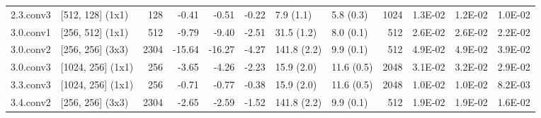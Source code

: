 \begin{table}
\begin{tabular}{llrrrrllrrrr}
2.3.conv3 & [512, 128] (1x1) & 128 & {\cellcolor[HTML]{ECF7A6}} \color[HTML]{000000} -0.41 & {\cellcolor[HTML]{EEF8A8}} \color[HTML]{000000} -0.51 & {\cellcolor[HTML]{EBF7A3}} \color[HTML]{000000} -0.22 & 7.9 (1.1) & 5.8 (0.3) & 1024 & {\cellcolor[HTML]{CFEB85}} \color[HTML]{000000} 1.3E-02 & {\cellcolor[HTML]{CDEA83}} \color[HTML]{000000} 1.2E-02 & {\cellcolor[HTML]{C1E57B}} \color[HTML]{000000} 1.0E-02 \\
3.0.conv1 & [256, 512] (1x1) & 512 & {\cellcolor[HTML]{FCAA5F}} \color[HTML]{000000} -9.79 & {\cellcolor[HTML]{FDB163}} \color[HTML]{000000} -9.40 & {\cellcolor[HTML]{FFFCBA}} \color[HTML]{000000} -2.51 & 31.5 (1.2) & 8.0 (0.1) & 512 & {\cellcolor[HTML]{FFF5AE}} \color[HTML]{000000} 2.6E-02 & {\cellcolor[HTML]{FFF7B2}} \color[HTML]{000000} 2.6E-02 & {\cellcolor[HTML]{F7FCB4}} \color[HTML]{000000} 2.2E-02 \\
3.0.conv2 & [256, 256] (3x3) & 2304 & {\cellcolor[HTML]{E24731}} \color[HTML]{F1F1F1} -15.64 & {\cellcolor[HTML]{DD3D2D}} \color[HTML]{F1F1F1} -16.27 & {\cellcolor[HTML]{FEEDA1}} \color[HTML]{000000} -4.27 & 141.8 (2.2) & 9.9 (0.1) & 512 & {\cellcolor[HTML]{F67A49}} \color[HTML]{F1F1F1} 4.9E-02 & {\cellcolor[HTML]{F67A49}} \color[HTML]{F1F1F1} 4.9E-02 & {\cellcolor[HTML]{FDBF6F}} \color[HTML]{000000} 3.9E-02 \\
3.0.conv3 & [1024, 256] (1x1) & 256 & {\cellcolor[HTML]{FFF2AA}} \color[HTML]{000000} -3.65 & {\cellcolor[HTML]{FEEDA1}} \color[HTML]{000000} -4.26 & {\cellcolor[HTML]{FFFEBE}} \color[HTML]{000000} -2.23 & 15.9 (2.0) & 11.6 (0.5) & 2048 & {\cellcolor[HTML]{FEE491}} \color[HTML]{000000} 3.1E-02 & {\cellcolor[HTML]{FEE08B}} \color[HTML]{000000} 3.2E-02 & {\cellcolor[HTML]{FEEC9F}} \color[HTML]{000000} 2.9E-02 \\
3.3.conv3 & [1024, 256] (1x1) & 256 & {\cellcolor[HTML]{F1F9AC}} \color[HTML]{000000} -0.71 & {\cellcolor[HTML]{F1F9AC}} \color[HTML]{000000} -0.77 & {\cellcolor[HTML]{ECF7A6}} \color[HTML]{000000} -0.38 & 15.9 (2.0) & 11.6 (0.5) & 2048 & {\cellcolor[HTML]{C1E57B}} \color[HTML]{000000} 1.0E-02 & {\cellcolor[HTML]{C3E67D}} \color[HTML]{000000} 1.0E-02 & {\cellcolor[HTML]{B7E075}} \color[HTML]{000000} 8.2E-03 \\
3.4.conv2 & [256, 256] (3x3) & 2304 & {\cellcolor[HTML]{FFFBB8}} \color[HTML]{000000} -2.65 & {\cellcolor[HTML]{FFFCBA}} \color[HTML]{000000} -2.59 & {\cellcolor[HTML]{F8FCB6}} \color[HTML]{000000} -1.52 & 141.8 (2.2) & 9.9 (0.1) & 512 & {\cellcolor[HTML]{EEF8A8}} \color[HTML]{000000} 1.9E-02 & {\cellcolor[HTML]{EEF8A8}} \color[HTML]{000000} 1.9E-02 & {\cellcolor[HTML]{E2F397}} \color[HTML]{000000} 1.6E-02 \\

\end{tabular}
\end{table}
